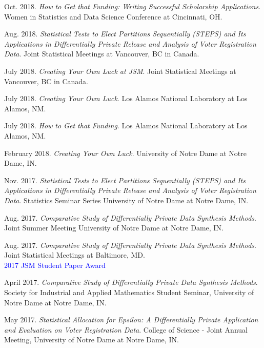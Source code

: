 \documentclass[11pt, letterpaper, roman]{moderncv} %
\begin{document}
\begin{etaremune}[topsep=0pt, itemsep=3pt, partopsep=0pt, parsep=0pt]
    \item Oct. 2018. \textit{How to Get that Funding: Writing Successful Scholarship Applications}. Women in Statistics and Data Science Conference at Cincinnati, OH.
    
    \item Aug. 2018. \textit{Statistical Tests to Elect Partitions Sequentially (STEPS) and Its Applications in Differentially Private Release and Analysis of Voter Registration Data}. Joint Statistical Meetings at Vancouver, BC in Canada.
    
    \item July 2018. \textit{Creating Your Own Luck at JSM}. Joint Statistical Meetings at Vancouver, BC in Canada.
    
    \item July 2018. \textit{Creating Your Own Luck}. Los Alamos National Laboratory at Los Alamos, NM.
    
    \item July 2018. \textit{How to Get that Funding}. Los Alamos National Laboratory at Los Alamos, NM.
    
    \item February 2018. \textit{Creating Your Own Luck}. University of Notre Dame at Notre Dame, IN.
    
    \item Nov. 2017. \textit{Statistical Tests to Elect Partitions Sequentially (STEPS) and Its Applications in Differentially Private Release and Analysis of Voter Registration Data}. Statistics Seminar Series University of Notre Dame at Notre Dame, IN.
    
    \item Aug. 2017. \textit{Comparative Study of Differentially Private Data Synthesis Methods}. Joint Summer Meeting University of Notre Dame at Notre Dame, IN.
    
    \item Aug. 2017. \textit{Comparative Study of Differentially Private Data Synthesis Methods}. Joint Statistical Meetings at Baltimore, MD.\\
    \textcolor{blue}{2017 JSM Student Paper Award}
    
    \item April 2017. \textit{Comparative Study of Differentially Private Data Synthesis Methods}. Society for Industrial and Applied Mathematics Student Seminar, University of Notre Dame at Notre Dame, IN.
    
    \item May 2017. \textit{Statistical Allocation for Epsilon: A Differentially Private Application and Evaluation on Voter Registration Data}. College of Science - Joint Annual Meeting, University of Notre Dame at Notre Dame, IN.
    

\end{etaremune}
\end{document}
